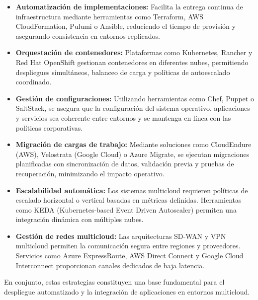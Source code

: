 {            \begin{itemize}
                \item \textbf{Automatización de implementaciones:} Facilita la entrega continua de infraestructura mediante herramientas como Terraform, AWS CloudFormation, Pulumi o Ansible, reduciendo el tiempo de provisión y asegurando consistencia en entornos replicados.
                
                \item \textbf{Orquestación de contenedores:} Plataformas como Kubernetes, Rancher y Red Hat OpenShift gestionan contenedores en diferentes nubes, permitiendo despliegues simultáneos, balanceo de carga y políticas de autoescalado coordinado.
                
                \item \textbf{Gestión de configuraciones:} Utilizando herramientas como Chef, Puppet o SaltStack, se asegura que la configuración del sistema operativo, aplicaciones y servicios sea coherente entre entornos y se mantenga en línea con las políticas corporativas.
                
                \item \textbf{Migración de cargas de trabajo:} Mediante soluciones como CloudEndure (AWS), Velostrata (Google Cloud) o Azure Migrate, se ejecutan migraciones planificadas con sincronización de datos, validación previa y pruebas de recuperación, minimizando el impacto operativo.
                
                \item \textbf{Escalabilidad automática:} Los sistemas multicloud requieren políticas de escalado horizontal o vertical basadas en métricas definidas. Herramientas como KEDA (Kubernetes-based Event Driven Autoscaler) permiten una integración dinámica con múltiples nubes.
                
                \item \textbf{Gestión de redes multicloud:} Las arquitecturas SD-WAN y VPN multicloud permiten la comunicación segura entre regiones y proveedores. Servicios como Azure ExpressRoute, AWS Direct Connect y Google Cloud Interconnect proporcionan canales dedicados de baja latencia.
            \end{itemize}
            
            En conjunto, estas estrategias constituyen una base fundamental para el despliegue automatizado y la integración de aplicaciones en entornos multicloud.
            
}
